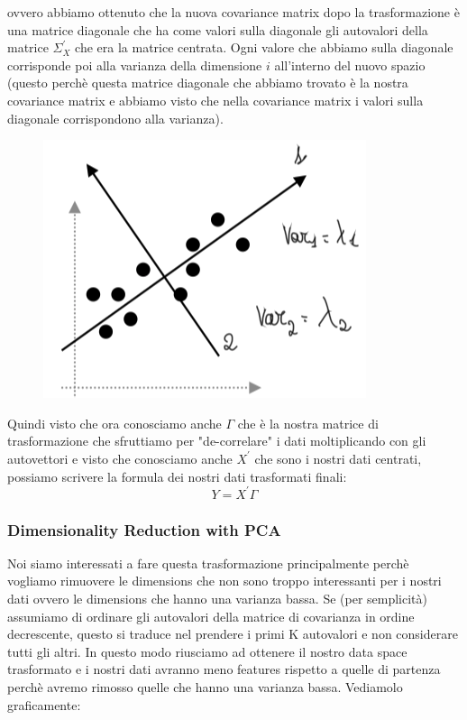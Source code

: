 \documentclass[14pt]{extreport}
\begin{document}
ovvero abbiamo ottenuto che la nuova covariance matrix dopo la trasformazione è una matrice diagonale che ha come valori sulla
diagonale gli autovalori della matrice $\Sigma_X^{'}$ che era la matrice centrata.
Ogni valore che abbiamo sulla diagonale corrisponde poi alla varianza della dimensione $i$ all'interno del nuovo spazio (questo perchè 
questa matrice diagonale che abbiamo trovato è la nostra covariance matrix e abbiamo visto che nella covariance matrix i valori
sulla diagonale corrispondono alla varianza).


\begin{figure}[H] 
\centering
\includegraphics[width=0.7\linewidth]{449.jpeg}
\end{figure}

Quindi visto che ora conosciamo anche $\Gamma$ che è la nostra matrice di trasformazione che sfruttiamo per "de-correlare" i dati 
moltiplicando con gli autovettori e visto che conosciamo anche $X^{'}$ che sono i nostri dati centrati, possiamo scrivere 
la formula dei nostri dati trasformati finali:
$$Y = X^{'}\Gamma$$


\subsubsection{Dimensionality Reduction with PCA}

Noi siamo interessati a fare questa trasformazione principalmente perchè vogliamo rimuovere le dimensions che non sono troppo 
interessanti per i nostri dati ovvero le dimensions che hanno una varianza bassa.
Se (per semplicità) assumiamo di ordinare gli autovalori della matrice di covarianza in ordine decrescente, questo si traduce nel prendere
i primi K autovalori e non considerare tutti gli altri.
In questo modo riusciamo ad ottenere il nostro data space trasformato e i nostri dati avranno meno features rispetto a quelle di partenza
perchè avremo rimosso quelle che hanno una varianza bassa.
Vediamolo graficamente:
\end{document}

